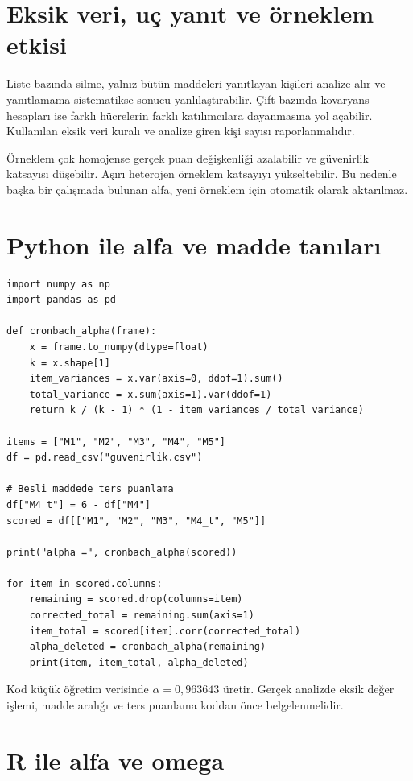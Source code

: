 \section{Eksik veri, uç yanıt ve örneklem etkisi}

Liste bazında silme, yalnız bütün maddeleri yanıtlayan kişileri analize alır ve
yanıtlamama sistematikse sonucu yanlılaştırabilir. Çift bazında kovaryans
hesapları ise farklı hücrelerin farklı katılımcılara dayanmasına yol açabilir.
Kullanılan eksik veri kuralı ve analize giren kişi sayısı raporlanmalıdır.

Örneklem çok homojense gerçek puan değişkenliği azalabilir ve güvenirlik
katsayısı düşebilir. Aşırı heterojen örneklem katsayıyı yükseltebilir. Bu
nedenle başka bir çalışmada bulunan alfa, yeni örneklem için otomatik olarak
aktarılmaz.

\section{Python ile alfa ve madde tanıları}

\begin{lstlisting}[style=prismPython,caption={Cronbach alfa ve madde tanıları için Python kodu}]
import numpy as np
import pandas as pd

def cronbach_alpha(frame):
    x = frame.to_numpy(dtype=float)
    k = x.shape[1]
    item_variances = x.var(axis=0, ddof=1).sum()
    total_variance = x.sum(axis=1).var(ddof=1)
    return k / (k - 1) * (1 - item_variances / total_variance)

items = ["M1", "M2", "M3", "M4", "M5"]
df = pd.read_csv("guvenirlik.csv")

# Besli maddede ters puanlama
df["M4_t"] = 6 - df["M4"]
scored = df[["M1", "M2", "M3", "M4_t", "M5"]]

print("alpha =", cronbach_alpha(scored))

for item in scored.columns:
    remaining = scored.drop(columns=item)
    corrected_total = remaining.sum(axis=1)
    item_total = scored[item].corr(corrected_total)
    alpha_deleted = cronbach_alpha(remaining)
    print(item, item_total, alpha_deleted)
\end{lstlisting}

Kod küçük öğretim verisinde $\alpha=0{,}963643$ üretir. Gerçek analizde
eksik değer işlemi, madde aralığı ve ters puanlama koddan önce belgelenmelidir.

\section{R ile alfa ve omega}

